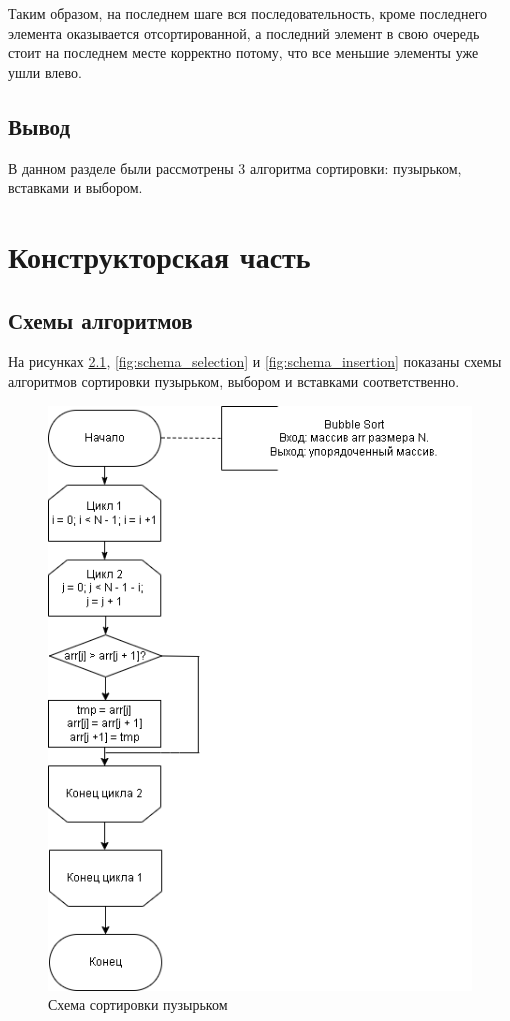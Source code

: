 \documentclass[a4paper,12pt]{report}
\begin{document}
	Таким образом, на последнем шаге вся последовательность, кроме последнего элемента оказывается отсортированной, а последний элемент в свою очередь стоит на последнем месте корректно потому, что все меньшие элементы уже ушли влево.
	
	\section{Вывод}
	
	В данном разделе были рассмотрены 3 алгоритма сортировки: пузырьком, вставками и выбором.
	
	\clearpage
	
	\chapter{Конструкторская часть}
	
	\section{Схемы алгоритмов}
	
	На рисунках \ref{fig:schema_bubble}, \ref{fig:schema_selection} и \ref{fig:schema_insertion} показаны схемы алгоритмов сортировки пузырьком, выбором и вставками соответственно.
	
	\begin{figure}[h]
		\centering
		\includegraphics[width=0.9\linewidth]{bubble}
		\caption{Схема сортировки пузырьком}
		\label{fig:schema_bubble}
	\end{figure}
	
\end{document}
